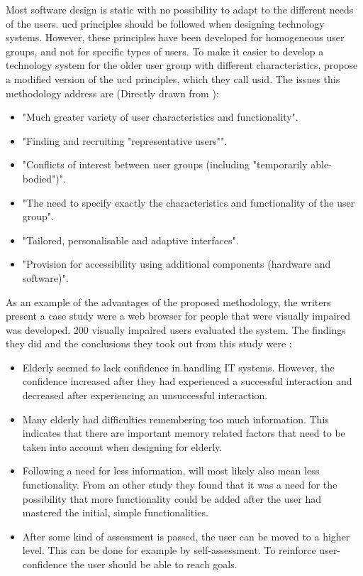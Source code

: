 Most software design is static with no possibility to adapt to the different needs of the users. \ac{ucd} principles should be followed when designing technology systems. However, these principles have been developed for homogeneous user groups, and not for specific types of users. To make it easier to develop a technology system for the older user group with different characteristics, \cite{gregor} propose a modified version of the \ac{ucd} principles, which they call \ac{usid}. The issues this methodology address are (Directly drawn from \cite{gregor}): 
\begin{itemize}
\item "Much greater variety of user characteristics and functionality". 
\item "Finding and recruiting "representative users"". 
\item "Conflicts of interest between user groups (including "temporarily able-bodied")".
\item "The need to specify exactly the characteristics and functionality of the user group".
\item "Tailored, personalisable and adaptive interfaces".
\item "Provision for accessibility using additional components (hardware and software)".
\end{itemize}

As an example of the advantages of the proposed methodology, the writers present a case study were a  web browser for people that were visually impaired was developed. 200 visually impaired users evaluated the system.  The findings they did and the conclusions they took out from this study were \cite{gregor}: 
\begin{itemize}
\item Elderly seemed to lack confidence in handling IT systems. However, the confidence increased after they had experienced a successful interaction and decreased after experiencing an unsuccessful interaction.
\item Many elderly had difficulties remembering too much information. This indicates that there are important memory related factors that need to be taken into account when designing for elderly. 
\item Following a need for less information, will most likely also mean less functionality. From an other study they found that it was a need for the possibility that more functionality could be added after the user had mastered the initial, simple functionalities.
\item After some kind of assessment is passed, the user can be moved to a higher level. This can be done for example by self-assessment. To reinforce user-confidence the user should be able to reach goals. 
\end{itemize}

